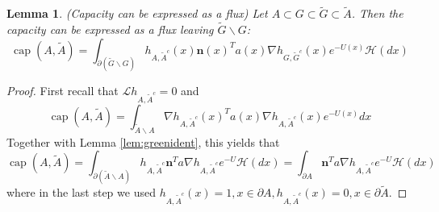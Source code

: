 \documentclass[english, aip, jcp, priprint, graphicx,floatfix]{revtex4-1}
\newcommand{\tmop}[1]{\ensuremath{\operatorname{#1}}}
\newtheorem{lemma}{Lemma}
\theoremstyle{plain}
\theoremstyle{definition}
\theoremstyle{plain}
\newcommand{\hausdorffmeasure}{\mathscr{H}(dx)}
\begin{document}
\begingroup
\def\thelemma{\ref{lem:capacity_lemma}}
\begin{lemma}(Capacity can be expressed as a flux) Let $A\subset G \subset \tilde G \subset \tilde A$.  Then the capacity can be expressed as a flux leaving $\tilde G \backslash G$:
\begin{equation*}
\ensuremath{\operatorname{cap}} (A, \tilde{A}) = \int_{\partial (\tilde G \backslash G)}  h_{A, \tilde{A}^c} (x)   \textbf{n}(x)^T a (x) \nabla h_{G, \tilde{G}^c} (x)e^{- U (x)} \hausdorffmeasure
\end{equation*}
\end{lemma}
\addtocounter{lemma}{-1}
\endgroup
\begin{proof}
First recall that $\mathcal{L} h_{A, \tilde{A}^c} = 0$ and
\begin{equation*}
	\tmop{cap}(A,\tilde A) = \int_{\tilde A \backslash A} \nabla h_{A, \tilde{A}^c} (x)^T a(x) \nabla h_{A, \tilde{A}^c} (x) e^{-U(x)} dx
\end{equation*}
Together with Lemma \ref{lem:greenident}, this yields that
\begin{equation}\label{eq:lemmaproof}
\tmop{cap}(A,\tilde A)  = \int_{\partial (\tilde A \backslash A)}  h_{A, \tilde{A}^c} \textbf{n}^T a  \nabla h_{A, \tilde{A}^c} e^{- U } \hausdorffmeasure = \int_{\partial A}  \textbf{n}^T a  \nabla h_{A, \tilde{A}^c} e^{- U } \hausdorffmeasure
\end{equation}
where in the last step we used $h_{A,\tilde A^c}(x)=1,x\in \partial A,h_{A,\tilde A^c}(x)=0,x\in \partial \tilde A$.  


\end{proof}
\end{document}
